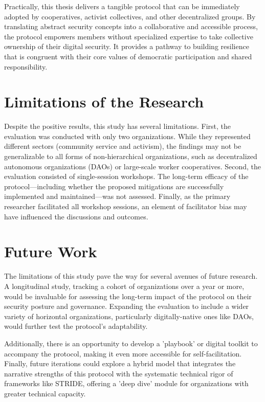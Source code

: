 Practically, this thesis delivers a tangible protocol that can be immediately
adopted by cooperatives, activist collectives, and other decentralized groups.
By translating abstract security concepts into a collaborative and accessible
process, the protocol empowers members without specialized expertise to take
collective ownership of their digital security. It provides a pathway to
building resilience that is congruent with their core values of democratic
participation and shared responsibility.

\section{Limitations of the Research}
\label{sec:limitations-of-the-research}

Despite the positive results, this study has several limitations. First, the
evaluation was conducted with only two organizations. While they represented
different sectors (community service and activism), the findings may not be
generalizable to all forms of non-hierarchical organizations, such as
decentralized autonomous organizations (DAOs) or large-scale worker
cooperatives. Second, the evaluation consisted of single-session workshops. The
long-term efficacy of the protocol—including whether the proposed mitigations
are successfully implemented and maintained—was not assessed. Finally, as the
primary researcher facilitated all workshop sessions, an element of facilitator
bias may have influenced the discussions and outcomes.

\section{Future Work}
\label{sec:future-work}

The limitations of this study pave the way for several avenues of future
research. A longitudinal study, tracking a cohort of organizations over a year
or more, would be invaluable for assessing the long-term impact of the protocol
on their security posture and governance. Expanding the evaluation to include a
wider variety of horizontal organizations, particularly digitally-native ones
like DAOs, would further test the protocol's adaptability.

Additionally, there is an opportunity to develop a 'playbook' or digital toolkit
to accompany the protocol, making it even more accessible for self-facilitation.
Finally, future iterations could explore a hybrid model that integrates the
narrative strengths of this protocol with the systematic technical rigor of
frameworks like STRIDE, offering a 'deep dive' module for organizations with
greater technical capacity.